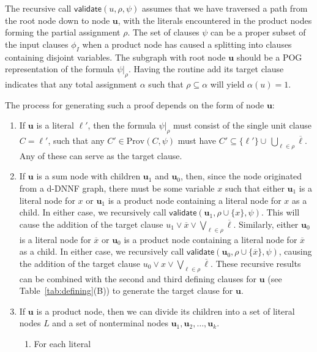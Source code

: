 \documentclass[letterpaper,USenglish,cleveref, autoref, thm-restate]{lipics-v2021}
\newcommand{\obar}[1]{\overline{#1}}
\newcommand{\lit}{\ell}
\newcommand{\assign}{\alpha}
\newcommand{\passign}{\rho}
\newcommand{\validate}{\textsf{validate}}
\newcommand{\prov}{\textrm{Prov}}
\newcommand{\inputformula}{\phi_I}
\newcommand{\makenode}[1]{\mathbf{#1}}
\newcommand{\nodeu}{\makenode{u}}
\newcommand{\simplify}[2]{#1|_{#2}}
\begin{document}
The recursive call $\validate(u, \passign, \psi)$ assumes that we have
traversed a path from the root node down to node $\nodeu$, with the
literals encountered in the product nodes forming the partial
assignment $\passign$.  The set of clauses $\psi$ can be a proper
subset of the input clauses $\inputformula$ when a product node has caused
a splitting into clauses containing disjoint variables.
The subgraph with root node $\nodeu$ should be a POG representation of the formula
$\simplify{\psi}{\passign}$.  Having the
routine add its target clause indicates that any total assignment
$\assign$ such that $\passign \subseteq \assign$ will yield $\alpha(u) = 1$.

The process for generating such a proof depends on the form of node $\nodeu$:
\begin{enumerate}
\item If $\nodeu$ is a literal $\lit'$, then the formula
  $\simplify{\psi}{\passign}$ must consist of the single unit clause
  $C = \lit'$, such that any $C' \in \prov(C, \psi)$ must have $C' \subseteq \{ \lit' \} \cup\, \bigcup_{\lit \in \passign} \obar{\lit}$.
  Any of these can
  serve as the target clause.
\item If $\nodeu$ is a sum node with children $\nodeu_1$ and $\nodeu_0$,
  then, since the node originated from a d-DNNF graph, there must be
  some variable $x$ such that either $\nodeu_1$ is a literal node for $x$ or $\nodeu_1$ is a
  product node containing a literal node for $x$ as a child.  In either case, we
  recursively call $\validate(\nodeu_1, \passign \cup \{ x \}, \psi)$.
  This will cause the addition of the target clause
  $u_1 \lor \obar{x} \lor \bigvee_{\lit \in \passign} \obar{\lit}$.
Similarly, either $\nodeu_0$ is a literal node for $\obar{x}$ or $\nodeu_0$ is a product node containing a literal node for $\obar{x}$ as
  a child.  In either case, we recursively call $\validate(\nodeu_0, \passign \cup \{ \obar{x} \}, \psi)$,
  causing the addition of the target clause
  $u_0 \lor x \lor \bigvee_{\lit \in \passign} \obar{\lit}$.
  These recursive results can be combined with the second and third defining clauses for $\nodeu$
(see Table~\ref{tab:defining}(B))
  to generate the target clause for $\nodeu$.
\item If $\nodeu$ is a product node, then we can divide its children
  into a set of literal nodes $L$ and a set of nonterminal nodes $\nodeu_1, \nodeu_2, \ldots, \nodeu_k$.
  \begin{enumerate}
    \item For each literal

\end{enumerate}
\end{enumerate}
\end{document}
